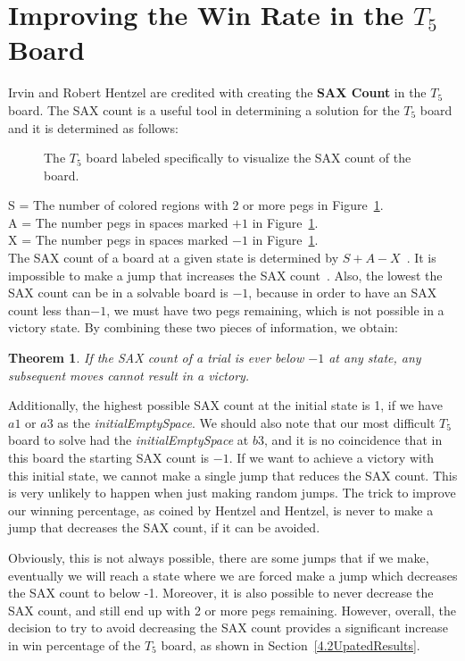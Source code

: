 \documentclass{article}
\newtheorem{theorem}{Theorem}
\newcommand\tab[1][.5cm]{\hspace*{#1}}
\begin{document}
\section{Improving the Win Rate in the $T_5$ Board}
\label{4SAX}

Irvin and Robert Hentzel are credited with creating the \textbf{SAX Count} in the $T_5$ board. The SAX count is a useful tool in determining a solution for the $T_5$ board and it is determined as follows:\\

\begin{figure}[htb]
\centering
{}
\caption{The $T_5$ board labeled specifically to visualize the SAX count of the board.}
\label{fig9}
\end{figure}

\large S = The number of colored regions with 2 or more pegs in Figure~\ref{fig9}.\\
\tab\large A = The number pegs in spaces marked $+1$ in Figure~\ref{fig9}.\\
\tab\large X =  The number pegs in spaces marked $-1$ in Figure~\ref{fig9}.\\

\normalsize The SAX count of a board at a given state is determined by $S+A-X$~\cite{Hentzel}. It is impossible to make a jump that increases the SAX count~\cite{Bell}. Also, the lowest the SAX count can be in a solvable board is $-1$, because in order to have an SAX count less than$-1$, we must have two pegs remaining, which is not possible in a victory state. By combining these two pieces of information, we obtain:
\begin{theorem}
If the SAX count of a trial is ever below $-1$ at any state, any subsequent moves cannot result in a victory.
\end{theorem} 
Additionally, the highest possible SAX count at the initial state is 1, if we have $a1$ or $a3$ as the \textit{initialEmptySpace}. We should also note that our most difficult $T_5$ board to solve had the \textit{initialEmptySpace} at $b3$, and it is no coincidence that in this board the starting SAX count is $-1$. If we want to achieve a victory with this initial state, we cannot make a single jump that reduces the SAX count. This is very unlikely to happen when just making random jumps. The trick to improve our winning percentage, as coined by Hentzel and Hentzel, is never to make a jump that decreases the SAX count, if it can be avoided.

Obviously, this is not always possible, there are some jumps that if we make, eventually we will reach a state where we are forced make a jump which decreases the SAX count to below -1. Moreover, it is also possible to never decrease the SAX count, and still end up with 2 or more pegs remaining. However, overall, the decision to try to avoid decreasing the SAX count provides a significant increase in win percentage of the $T_5$ board, as shown in Section~\ref{4.2UpatedResults}. 
\end{document}
